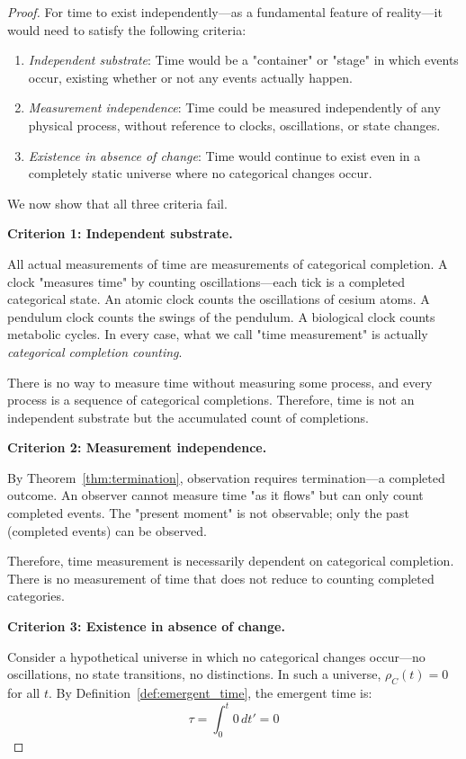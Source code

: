 \documentclass[12pt,a4paper]{article}
\theoremstyle{definition}
\theoremstyle{remark}
\begin{document}
\begin{proof}
For time to exist independently—as a fundamental feature of reality—it would need to satisfy the following criteria:
\begin{enumerate}
    \item \emph{Independent substrate}: Time would be a "container" or "stage" in which events occur, existing whether or not any events actually happen.
    \item \emph{Measurement independence}: Time could be measured independently of any physical process, without reference to clocks, oscillations, or state changes.
    \item \emph{Existence in absence of change}: Time would continue to exist even in a completely static universe where no categorical changes occur.
\end{enumerate}

We now show that all three criteria fail.

\textbf{Criterion 1: Independent substrate.}

All actual measurements of time are measurements of categorical completion. A clock "measures time" by counting oscillations—each tick is a completed categorical state. An atomic clock counts the oscillations of cesium atoms. A pendulum clock counts the swings of the pendulum. A biological clock counts metabolic cycles. In every case, what we call "time measurement" is actually \emph{categorical completion counting}.

There is no way to measure time without measuring some process, and every process is a sequence of categorical completions. Therefore, time is not an independent substrate but the accumulated count of completions.

\textbf{Criterion 2: Measurement independence.}

By Theorem~\ref{thm:termination}, observation requires termination—a completed outcome. An observer cannot measure time "as it flows" but can only count completed events. The "present moment" is not observable; only the past (completed events) can be observed.

Therefore, time measurement is necessarily dependent on categorical completion. There is no measurement of time that does not reduce to counting completed categories.

\textbf{Criterion 3: Existence in absence of change.}

Consider a hypothetical universe in which no categorical changes occur—no oscillations, no state transitions, no distinctions. In such a universe, $\rho_C(t) = 0$ for all $t$. By Definition~\ref{def:emergent_time}, the emergent time is:
\begin{equation}
\tau = \int_0^t 0 \, dt' = 0
\end{equation}


\end{proof}
\end{document}
